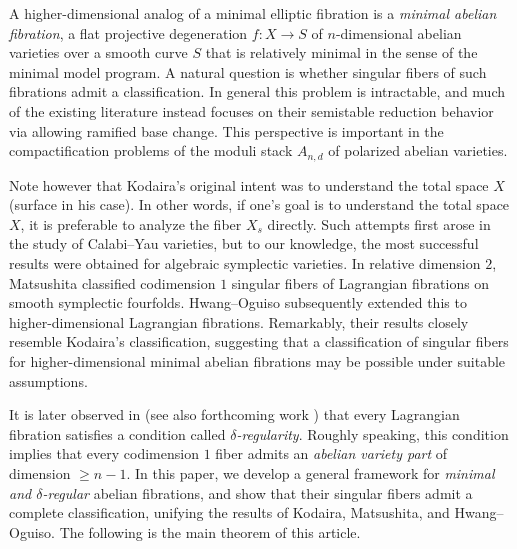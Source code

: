 \documentclass[reqno, letterpaper]{amsart}
\numberwithin{equation}{subsection}
\let\to\longrightarrow
\begin{document}
	A higher-dimensional analog of a minimal elliptic fibration is a \emph{minimal abelian fibration}, a flat projective degeneration $f : X \to S$ of $n$-dimensional abelian varieties over a smooth curve $S$ that is relatively minimal in the sense of the minimal model program. A natural question is whether singular fibers of such fibrations admit a classification. In general this problem is intractable, and much of the existing literature instead focuses on their semistable reduction behavior via allowing ramified base change. This perspective is important in the compactification problems of the moduli stack $A_{n,d}$ of polarized abelian varieties.
	
	Note however that Kodaira's original intent was to understand the total space $X$ (surface in his case). In other words, if one's goal is to understand the total space $X$, it is preferable to analyze the fiber $X_s$ directly. Such attempts first arose in the study of Calabi--Yau varieties, but to our knowledge, the most successful results were obtained for algebraic symplectic varieties. In relative dimension $2$, Matsushita \cite{mat01} classified codimension $1$ singular fibers of Lagrangian fibrations on smooth symplectic fourfolds. Hwang--Oguiso \cite{hwang-ogu09, hwang-ogu11, hwang-ogu16} subsequently extended this to higher-dimensional Lagrangian fibrations. Remarkably, their results closely resemble Kodaira's classification, suggesting that a classification of singular fibers for higher-dimensional minimal abelian fibrations may be possible under suitable assumptions.
	
	It is later observed in \cite{kim24} (see also forthcoming work \cite{decat-kim-sch26}) that every Lagrangian fibration satisfies a condition called \emph{$\delta$-regularity}. Roughly speaking, this condition implies that every codimension $1$ fiber admits an \emph{abelian variety part} of dimension $\ge n-1$. In this paper, we develop a general framework for \emph{minimal and $\delta$-regular} abelian fibrations, and show that their singular fibers admit a complete classification, unifying the results of Kodaira, Matsushita, and Hwang--Oguiso. The following is the main theorem of this article.
	
\end{document}
